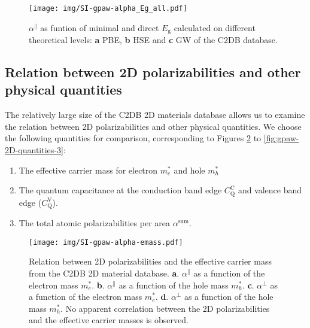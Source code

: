 \documentclass[manuscript=suppinfo,email=true,hyperref=true,keywords=false]{achemso}
\begin{document}
\begin{figure}[htbp]
  \centering
  \texttt{[image: img/SI-gpaw-alpha\_Eg\_all.pdf]}
  \caption{$\alpha^{\parallel}$ as funtion of minimal and direct
    $E_{\mathrm{g}}$ calculated on different theoretical levels:
    \textbf{a} PBE, \textbf{b} HSE and \textbf{c} GW of the C2DB
    database.}
  \label{fig:SI-gpaw-alpha-Eg-all}
\end{figure}

\subsection{Relation between 2D polarizabilities and other physical quantities}
\label{sec:gpaw-3}

The relatively large size of the C2DB 2D materials database allows us
to examine the relation between 2D polarizabilities and other physical
quantities. We choose the following quantities for comparison,
corresponding to Figures \ref{fig:gpaw-2D-quantities-1} to
\ref{fig:gpaw-2D-quantities-3}:
\begin{enumerate}
\item The effective carrier mass for electron $m_{e}^{*}$ and hole $m_{h}^{*}$
  
\item The quantum capacitance at the conduction band edge
  $C_{\mathrm{Q}}^{\mathrm{C}}$ and valence band edge
  ($C_{\mathrm{Q}}^{\mathrm{V}}$).

  
\item The total atomic polarizabilities per area $\alpha^{\mathrm{sum}}$.
\end{enumerate}
\begin{figure}[htbp]
  \centering
  \texttt{[image: img/SI-gpaw-alpha-emass.pdf]}
  \caption{Relation between 2D polarizabilities and the effective
    carrier mass from the C2DB 2D material
    database. \textbf{a}. $\alpha^{\parallel}$ as a function of the
    electron mass $m_{e}^{*}$.  \textbf{b}. $\alpha^{\parallel}$ as a
    function of the hole mass
    $m_{h}^{*}$. \textbf{c}. $\alpha^{\perp}$ as a function of the
    electron mass $m_{e}^{*}$.  \textbf{d}. $\alpha^{\perp}$ as a
    function of the hole mass $m_{h}^{*}$. No apparent correlation
    between the 2D polarizabilities and the effective carrier masses
    is observed.}
  \label{fig:gpaw-2D-quantities-1}
\end{figure}
\end{document}
